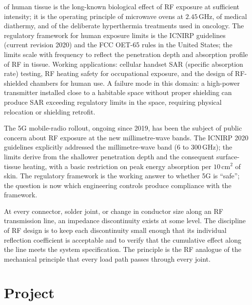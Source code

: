  of human tissue is the long-known biological
effect of RF exposure at sufficient intensity; it is the operating
principle of microwave ovens at $2.45\,\si{\giga\hertz}$, of medical
diathermy, and of the deliberate hyperthermia treatments used in
oncology. The regulatory framework for human exposure limits is the
ICNIRP guidelines (current revision 2020) and the FCC OET-65 rules in
the United States; the limits scale with frequency to reflect the
penetration depth and absorption profile of RF in tissue. Working
applications: cellular handset SAR (specific absorption rate)
testing, RF heating safety for occupational exposure, and the design
of RF-shielded chambers for human use. A failure mode in this
domain: a high-power transmitter installed close to a habitable space
without proper shielding can produce SAR exceeding regulatory limits
in the space, requiring physical relocation or shielding retrofit.

The 5G mobile-radio rollout, ongoing since 2019, has been the subject
of public concern about RF exposure at the new millimetre-wave bands.
The ICNIRP 2020 guidelines explicitly addressed the millimetre-wave
band ($6$ to $300\,\si{\giga\hertz}$); the limits derive from the
shallower penetration depth and the consequent surface-tissue
heating, with a basic restriction on peak energy absorption per
$10\,\si{\centi\meter}^{2}$ of skin. The regulatory framework is the
working answer to whether 5G is ``safe''; the question is now which
engineering controls produce compliance with the framework.

\begin{principle}
At every connector, solder joint, or change in conductor size along
an RF transmission line, an impedance discontinuity exists at some
level. The discipline of RF design is to keep each discontinuity
small enough that its individual reflection coefficient is acceptable
and to verify that the cumulative effect along the line meets the
system specification. The principle is the RF analogue of the
mechanical principle that every load path passes through every
joint.
\end{principle}

\section{Project}

